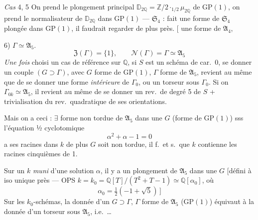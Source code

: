\documentclass[11pt,a4paper]{article}
\begin{document}
\emph{Cas} 4, 5  On prend le plongement principal
$\mathbb{D}_{2\mathbb{Q}} = \mathbb{Z}/2 \cdot_{1/2} \mu_{2\mathbb{Q}}$ de
$\mathrm{GP}(1)$, on prend le normalisateur de
$\mathbb{D}_{2\mathbb{Q}}$ dans $\mathrm{GP}(1)$ --- $\mathfrak{S}_4$
\ill{} : fait une forme  de $\mathfrak{S}_4$ plongée dans
$\mathrm{GP}(1)$, il faudrait regarder de plus près. [\ill{} \ill{}
\ill{} \ill{} \ill{} une forme de $\mathfrak{A}_4$,

6) $\Gamma \simeq \mathfrak{A}_5$.
\[
  \mathfrak{Z}(\Gamma) = \lbrace 1 \rbrace, \qquad
  \mathcal{N}(\Gamma) = \Gamma \simeq \mathfrak{A}_5
\]
\emph{Une fois} choisi un cas de référence  sur
$\mathbb{Q}$, si $S$ est un schéma de car.\ 0, se donner un couple
$(G \supset \Gamma)$, avec $G$ forme de $\mathrm{GP}(1)$, $\Gamma$ forme de
$\mathfrak{A}_5$, revient au même que de se donner une forme
\emph{intérieure} de $\Gamma_0$, ou un torseur sous $\Gamma_0$. Si on
 \struck{\ill{}} $\Gamma_{0k} \simeq \mathfrak{A}_5$, il
revient au même de se donner \struck{\ill{}} un rev.\ de degré 5 de $S$ +
trivialisation du rev.\ quadratique de ses orientations.

Mais on a ceci : $\exists$  forme non tordue de
$\mathfrak{A}_5$ dans une $G$ (forme de $\mathrm{GP}(1)$) sss l'équation
½ cyclotomique
\[
  \alpha^2 + \alpha - 1 = 0
\]
a ses racines dans $k$  
de plus $G$ soit non tordue, il f.\ et s.\ que $k$ contienne les racines
cinquièmes de 1.

Sur un $k$ \emph{muni} d'une solution $\alpha$, il y a un plongement
\struck{\ill{}} de $\mathfrak{A}_5$ dans une $G$ [défini à iso unique près
\add{en exigeant que l'\uncertain{invariant} d'un $5$-cycle permutation circulaire standard
soit $\alpha$ \uncertain{certain} $\alpha$ !]} --- OPS
$k = k_0 = \mathbb{Q}[T]/(T^2 + T - 1) \simeq \mathbb{Q}[\alpha_0]$, où
\[
  \alpha_0 = \tfrac{1}{2}(-1 + \sqrt{5}) \,]
\]
Sur les $k_0$-schémas, la donnée d'un $G \supset \Gamma$, $\Gamma$
 forme de $\mathfrak{A}_5$ ($\mathrm{GP}(1)$) équivaut à la
donnée d'un torseur sous $\mathfrak{A}_5$, i.e.\ \ldots
{}
\end{document}
